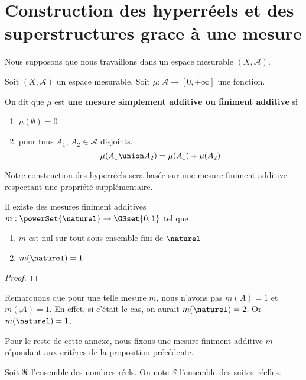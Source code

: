 \chapter{Construction des hyperréels et des superstructures grace à une mesure}

Nous supposons que nous travaillons dans un espace mesurable $(X, \mathcal{A})$.

\begin{definition}
	Soit $(X, \mathcal{A})$ un espace mesurable.
	Soit $\mu : \mathcal{A} \rightarrow [0, + \infty]$ une fonction.

	On dit que $\mu$ est \textbf{une mesure simplement additive ou finiment
	additive} si
	\begin{enumerate}
		\item $\mu(\emptyset) = 0$
		\item pour tous $A_{1}$, $A_{2} \in \mathcal{A}$ disjoints,
			\begin{equation}
				\mu(A_{1} \union A_{2}) = \mu(A_{1}) + \mu(A_{2})
			\end{equation}
	\end{enumerate}
\end{definition}

Notre construction des hyperréels sera basée sur une mesure finiment additive
respectant une propriété supplémentaire.

\begin{proposition}
	Il existe des mesures finiment additives $m : \powerSet{\naturel} \rightarrow
	\GSset{0, 1}$ tel que
	\begin{enumerate}
		\item $m$ est nul sur tout sous-ensemble fini de $\naturel$
		\item $m(\naturel) = 1$
	\end{enumerate}
\end{proposition}

\ifdefined\outputproof
\begin{proof}

\end{proof}
\fi

Remarquons que pour une telle mesure $m$, nous n'avons pas $m(A) = 1$ et
$m(\comp{A}) = 1$. En effet, si c'était le cas, on aurait $m(\naturel) = 2$. Or
$m(\naturel) = 1$.

Pour le reste de cette annexe, nous fixons une mesure finiment additive $m$
répondant aux critères de la proposition précédente.

\begin{notation}
	Soit $\real$ l'ensemble des nombres réels. On note $\mathcal{S}$ l'ensemble
	des suites réelles.
\end{notation}

